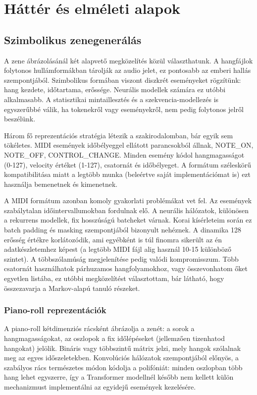 
\chapter{Háttér és elméleti alapok}

\section{Szimbolikus zenegenerálás}

A zene ábrázolásánál két alapvető megközelítés közül választhatunk. A hangfájlok folytonos hullámformákban tárolják az audio jelet, ez pontosabb az emberi hallás szempontjából. Szimbolikus formában viszont diszkrét eseményeket rögzítünk: hang kezdete, időtartama, erőssége. Neurális modellek számára ez utóbbi alkalmasabb. A statisztikai mintaillesztés és a szekvencia-modellezés is egyszerűbbé válik, ha tokenekről vagy eseményekről, nem pedig folytonos jelről beszélünk.

Három fő reprezentációs stratégia létezik a szakirodalomban, bár egyik sem tökéletes. MIDI események időbélyeggel ellátott parancsokból állnak, NOTE\_ON, NOTE\_OFF, CONTROL\_CHANGE. Minden esemény kódol hangmagasságot (0-127), velocity értéket (1-127), csatornát és időbélyeget. A formátum széleskörű kompatibilitása miatt a legtöbb munka (beleértve saját implementációmat is) ezt használja bemenetnek és kimenetnek.

A MIDI formátum azonban komoly gyakorlati problémákat vet fel. Az események szabálytalan időintervallumokban fordulnak elő. A neurális hálózatok, különösen a rekurrens modellek, fix hosszúságú batcheket várnak. Korai kísérleteim során ez batch padding és masking szempontjából bizonyult nehéznek. A dinamika 128 erősség értékre korlátozódik, ami egyébként is túl finomra sikerült az én adatkészletemhez képest (a legtöbb MIDI fájl alig használ 10-15 különböző szintet). A többszólamúság megjelenítése pedig valódi kompromisszum. Több csatornát használhatok párhuzamos hangfolyamokhoz, vagy összevonhatom őket egyetlen listába, ez utóbbi megközelítést választottam, bár látható, hogy összezavarja a Markov-alapú tanuló részeket.

\subsection{Piano-roll reprezentációk}

A piano-roll kétdimenziós rácsként ábrázolja a zenét: a sorok a hangmagasságokat, az oszlopok a fix időlépéseket (jellemzően tizenhatod hangokat) jelölik. Bináris vagy többszintű mátrix jelzi, mely hangok szólalnak meg az egyes időszeletekben. Konvolúciós hálózatok szempontjából előnyös, a szabályos rács természetes módon kódolja a polifóniát: minden oszlopban több hang lehet egyszerre, így a Transformer modellnél később nem kellett külön mechanizmust implementálni az egyidejű események kezelésére.

